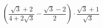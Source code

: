 \begin{ex}[type=calculate]
	\begin{condition}
		\( \left( \dfrac{\sqrt{3}+2}{4+2\sqrt{3}}-\dfrac{\sqrt{3}-2}{2} \right)\cdot\dfrac{\sqrt{3}+1}{\sqrt{3}} \)
	\end{condition}
\end{ex}